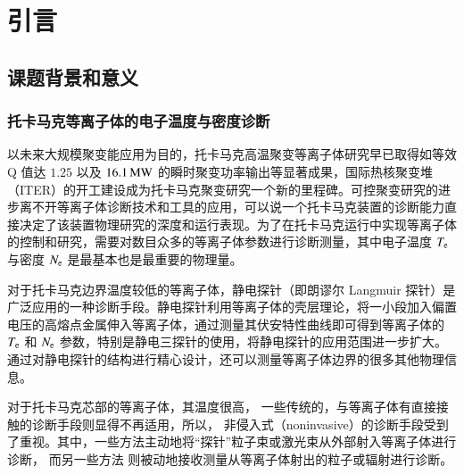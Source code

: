 ﻿\graphicspath{{figures/chap01/}}

\chapter{引言}\label{chap:introduction}

\section{课题背景和意义}

\subsection{托卡马克等离子体的电子温度与密度诊断}

以未来大规模聚变能应用为目的，托卡马克高温聚变等离子体研究早已取得如等效 Q 值达 $1.25$\cite{JT60U:Q1.25} 以及 $16.1\,{\rm MW}$\cite{JET:NF:16MW:1,JET:NF:16MW:2} 的瞬时聚变功率输出等显著成果，国际热核聚变堆（ITER）的开工建设\cite{Holtkamp2007:ITER}成为托卡马克聚变研究一个新的里程碑。可控聚变研究的进步离不开等离子体诊断技术和工具的应用，可以说一个托卡马克装置的诊断能力直接决定了该装置物理研究的深度和运行表现。为了在托卡马克运行中实现等离子体的控制和研究，需要对数目众多的等离子体参数进行诊断测量，其中电子温度 $T_{\rm e}$ 与密度 $N_{\rm e}$ 是最基本也是最重要的物理量\cite{ITERPhysics:chap7}。

对于托卡马克边界温度较低的等离子体，静电探针（即朗谬尔 Langmuir 探针）\cite{LangmuirProbe}是广泛应用的一种诊断手段。静电探针利用等离子体的壳层理论，将一小段加入偏置电压的高熔点金属伸入等离子体，通过测量其伏安特性曲线即可得到等离子体的 $T_{\rm e}$ 和 $N_{\rm e}$ 参数，特别是静电三探针\cite{tripleprobe}的使用，将静电探针的应用范围进一步扩大。通过对静电探针的结构进行精心设计，还可以测量等离子体边界的很多其他物理信息\cite{LangmiurProbe-EdgeTurbulance,LangmiurProbe-ZonalFlow}。

对于托卡马克芯部的等离子体，其温度很高，
一些传统的，与等离子体有直接接触的诊断手段则显得不再适用，所以，
非侵入式（noninvasive）的诊断手段受到了重视。其中，一些方法主动地将“探针”粒子束或激光束从外部射入等离子体进行诊断，%
而另一些方法%
则被动地接收测量从等离子体射出的粒子或辐射进行诊断。

